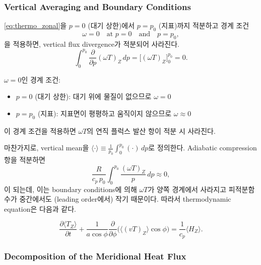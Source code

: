 \subsubsection{Vertical Averaging and Boundary Conditions}

\eqref{eq:thermo_zonal}을 $p=0$ (대기 상한)에서 $p=p_0$ (지표)까지 적분하고
경계 조건
\begin{equation}\label{eq:omega_bc}
  \omega = 0 \quad\text{at } p=0 \quad\text{and}\quad p=p_0,
\end{equation}
을 적용하면, vertical flux divergence가 적분되어 사라진다.
\[
  \int_0^{p_0}\frac{\partial}{\partial p}(\omega T)_Z\,dp
  = \bigl[(\omega T)_Z\bigr]_0^{p_0} = 0.
\]

\begin{hisublock}
$\omega=0$인 경계 조건:
\begin{itemize}
  \item $p=0$ (대기 상한): 대기 위에 물질이 없으므로 $\omega=0$
  \item $p=p_0$ (지표): 지표면이 평평하고 움직이지 않으므로 $\omega\approx 0$
\end{itemize}
이 경계 조건을 적용하면 $\omega T$의 연직 플럭스 발산 항이 적분 시 사라진다.
\end{hisublock}

\noindent
마찬가지로, vertical mean을
$\langle\cdot\rangle \equiv \frac{1}{p_0}\int_0^{p_0}(\cdot)\,dp$로 정의한다.
Adiabatic compression 항을 적분하면
\[
  \frac{R}{c_p\,p_0}\int_0^{p_0}\frac{(\omega T)_Z}{p}\,dp \approx 0,
\]
이 되는데, 이는 boundary conditions에 의해 $\omega T$가 양쪽 경계에서 사라지고
피적분함수가 중간에서도 (leading order에서) 작기 때문이다.  따라서
 thermodynamic equation은 다음과 같다.

\begin{equation}\label{eq:thermo_ZV}
  \boxed{
  \frac{\partial\langle T_Z\rangle}{\partial t}
    + \frac{1}{a\cos\phi}\frac{\partial}{\partial\phi}
      \bigl(\langle(vT)_Z\rangle\cos\phi\bigr)
  = \frac{1}{c_p}\langle H_Z\rangle.
  }
\end{equation}

\subsubsection{Decomposition of the Meridional Heat Flux}

